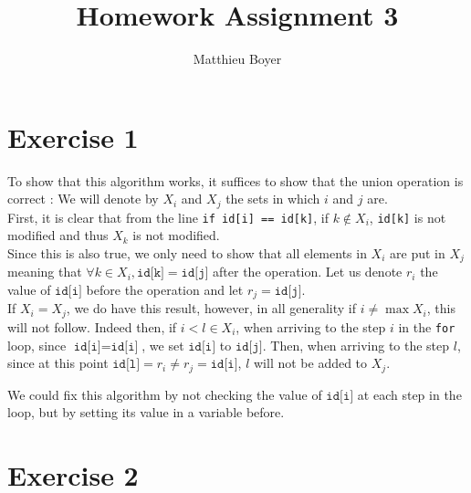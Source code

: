 \documentclass{cours}
\title{Homework Assignment 3}
\author{Matthieu Boyer}
\date{}
\begin{document}
\newpage
\section{Exercise 1}
To show that this algorithm works, it suffices to show that the union operation is correct : We will denote by $X_{i}$ and $X_{j}$ the sets in which $i$ and $j$ are.\\
First, it is clear that from the line \texttt{if id[i] == id[k]}, if $k \notin X_{i}$, \texttt{id[k]} is not modified and thus $X_{k}$ is not modified. \\
Since this is also true, we only need to show that all elements in $X_{i}$ are put in $X_{j}$ meaning that $\forall k \in X_{i}, \texttt{id[k]} = \texttt{id[j]}$ after the operation. Let us denote $r_{i}$ the value of $\texttt{id[i]}$ before the operation and let $r_{j} = \texttt{id[j]}$.\\
If $X_{i} = X_{j}$, we do have this result, however, in all generality if $i \neq \max X_{i}$, this will not follow. Indeed then, if $i < l \in X_{i}$, when arriving to the step $i$ in the \texttt{for} loop, since $\texttt{id[i]} = \texttt{id[i]}$, we set $\texttt{id[i]}$ to $\texttt{id[j]}$. Then, when arriving to the step $l$, since at this point $\texttt{id[l]} = r_{i} \neq r_{j} = \texttt{id[i]}$, $l$ will not be added to $X_{j}$.

We could fix this algorithm by not checking the value of $\texttt{id[i]}$ at each step in the loop, but by setting its value in a variable before.

\newpage
\section{Exercise 2}
\end{document}
